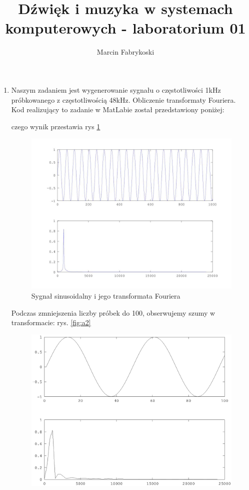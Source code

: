 \documentclass[11pt,a4paper]{article}
\title{Dźwięk i muzyka w systemach komputerowych - laboratorium 01}
\author{Marcin Fabrykoski}
\begin{document}
\maketitle
\newpage
\begin{enumerate}
\item Naszym zadaniem jest wygenerowanie sygnału o częstotliwości 1kHz próbkowanego z częstotliwością 48kHz. Obliczenie transformaty Fouriera.\\
Kod realizujący to zadanie w MatLabie został przedstawiony poniżej:

czego wynik przestawia rys \ref{fig:a1}\\
\begin{figure}
\centering
\includegraphics[scale=0.8]{proba1_dom}
\caption{Sygnał sinusoidalny i jego transformata Fouriera}
\label{fig:a1}
\end{figure}
Podczas zmniejszenia liczby próbek do 100, obserwujemy szumy w transformacie: rys. \ref{fig:a2}\\
\begin{figure}
\centering
\includegraphics[scale=0.8]{proba1_2_dom}

\end{figure}
\end{enumerate}
\end{document}
